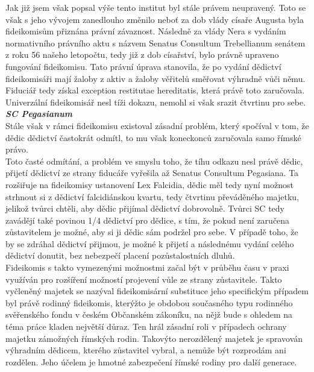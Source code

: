 \documentclass{article}
\begin{document}
Jak již jsem však popsal výše tento institut byl stále právem neupravený. Toto se však s jeho vývojem zanedlouho změnilo neboť za dob vlády císaře Augusta byla fideikomisům přiznána právní závaznost. Následně za vlády Nera s vydáním normativního právního aktu s názvem Senatus Consultum Trebe\-llianum senátem z roku 56 našeho letopočtu, tedy již z dob císařství, bylo právně upraveno fungování fideikomisu. Tato právní úprava stanovila, že po vydání dědictví fideikomisáři mají žaloby z aktiv a žaloby věřitelů směřovat výhradně vůči němu. Fiduciář tedy získal exception restitutae hereditatis, která právě toto zaručovala. Univerzální fideikomisář nesl tíži dokazu, nemohl si však srazit čtvrtinu pro sebe.\\ 

\noindent\textbf{\textit{SC Pegasianum}}\\


Stále však v rámci fideikomisu existoval zásadní problém, který spočíval v tom, že dědic dědictví častokrát odmítl, to mu však koneckonců zaručovala samo římské právo.\\ 

Toto časté odmítání, a problém ve smyslu toho, že tíhu odkazu nesl právě dědic, přijetí dědictví ze strany fiducáře vyřešila až Senatus Consultum Pegasiana. Ta rozšiřuje na fideikomisy ustanovení Lex Falcidia, dědic měl tedy nyní možnost strhnout si z dědictví falcidiánskou kvartu, tedy čtvrtinu převáděného majetku, jelikož tvůrci chtěli, aby dědic přijímal dědictví dobrovolně. Tvůrci SC tedy zavádějí také povinou 1/4 dědictví pro dědice, s tím, že pokud není zaručena zůstavitelem je možné, aby si ji dědic sám podržel pro sebe. V případě toho, že by se zdráhal dědictví přijmou, je možné k přijetí a následnému vydání celého dědictví donutit, bez nebezpečí placení pozůstalostních dluhů.\\

Fideikomis s takto vymezenými možnostmi začal být v průběhu času v praxi využíván pro rozšíření možností projevení vůle ze strany zůstavitele. Takto vyčleněný majetek se nazýval fideikomisární substituce jeho specifickým případ\-em byl právě rodinný fideikomis, kterýžto je obdobou současného typu rodinného svěřenského fondu v českém Občanském zákoníku, na nějž bude s ohledem na téma práce kladen největší důraz. Ten hrál zásadní roli v případech ochrany majetku zámožných římských rodin. Takovýto nerozdělený majetek je spravován výhradním dědicem, kterého zůstavitel vybral, a nemůže být rozprodám ani rozdělen. Jeho účelem je hmotné zabezpečení římské rodiny pro další generace.\\
\end{document}
